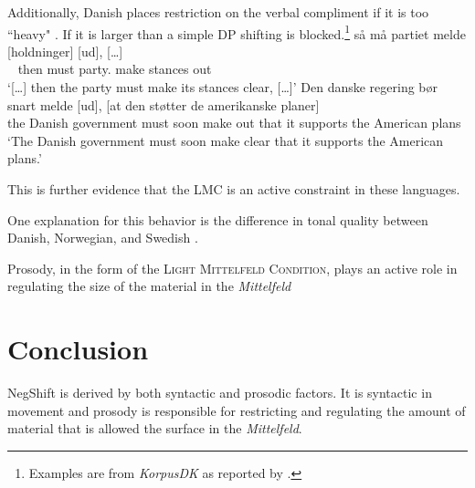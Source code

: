 \documentclass[12pt, letterpaper]{article}
\begin{document}
\ex Additionally, Danish places restriction on the verbal compliment if it is too ``heavy" \citep[44f]{mullerDanishHeadDrivenPhraseInpreparation}. 
	\ea If it is larger than a simple DP shifting is blocked.\footnote{Examples are from \emph{KorpusDK} as reported by \citet{mullerDanishHeadDrivenPhraseInpreparation}.} 
	\ex \gll {[…]} så må partiet melde [holdninger] [ud], {[…]}\\
	~ then must party.\Def{} make stances out\\
	\glt `{[…]} then the party must make its stances clear, {[…]}'
	\ex \gll Den danske regering bør snart melde [ud], [at den støtter de amerikanske planer]\\
	the Danish government must soon make out that it supports the American plans\\
	\glt `The Danish government must soon make clear that it supports the American plans.'
	\z 

\ex This is further evidence that the LMC is an active constraint in these languages. 

\ex One explanation for this behavior is the difference in tonal quality between Danish, Norwegian, and Swedish \citep{erteschik-shirVariationMainlandScandinavian2020}.
\z 

\begin{tcolorbox}[width=\linewidth]

Prosody, in the form of the \textsc{Light Mittelfeld Condition}, plays an active role in regulating the size of the material in the \emph{Mittelfeld}
\end{tcolorbox}
\section{Conclusion} \label{sec:CONCLUSION}

\begin{tcolorbox}[width=\linewidth]
\centering
NegShift is derived by both syntactic and prosodic factors. It is syntactic in movement and prosody is responsible for restricting and regulating the amount of material that is allowed the surface in the \emph{Mittelfeld}.
\end{tcolorbox}


\printbibliography[heading=bibintoc]
\end{document}
